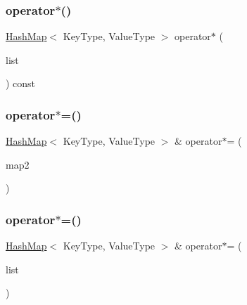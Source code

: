 \subsubsection{\texorpdfstring{operator$\ast$()}{operator*()}\hspace{0.1cm}{\footnotesize\ttfamily [2/2]}}
{\footnotesize\ttfamily \mbox{\hyperlink{classHashMap}{Hash\+Map}}$<$ Key\+Type, Value\+Type $>$ operator$\ast$ (\begin{DoxyParamCaption}\item[{std\+::initializer\+\_\+list$<$ std\+::pair$<$ Key\+Type, Value\+Type $>$ $>$}]{list }\end{DoxyParamCaption}) const}

\mbox{\label{classHashMap_aeeef62e8c38083e34f8a611816f9d767}} 
\subsubsection{\texorpdfstring{operator$\ast$=()}{operator*=()}\hspace{0.1cm}{\footnotesize\ttfamily [1/2]}}
{\footnotesize\ttfamily \mbox{\hyperlink{classHashMap}{Hash\+Map}}$<$ Key\+Type, Value\+Type $>$ \& operator$\ast$= (\begin{DoxyParamCaption}\item[{const \mbox{\hyperlink{classHashMap}{Hash\+Map}}$<$ Key\+Type, Value\+Type $>$ \&}]{map2 }\end{DoxyParamCaption})}

\mbox{\label{classHashMap_aeaca3b68c3c20b603a11827f8968aed7}} 
\subsubsection{\texorpdfstring{operator$\ast$=()}{operator*=()}\hspace{0.1cm}{\footnotesize\ttfamily [2/2]}}
{\footnotesize\ttfamily \mbox{\hyperlink{classHashMap}{Hash\+Map}}$<$ Key\+Type, Value\+Type $>$ \& operator$\ast$= (\begin{DoxyParamCaption}\item[{std\+::initializer\+\_\+list$<$ std\+::pair$<$ Key\+Type, Value\+Type $>$ $>$}]{list }\end{DoxyParamCaption})}

